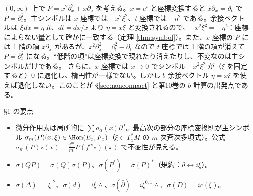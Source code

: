 \begin{ex}\label{ex:logcoord}
$(0,\infty)$ 上で $P=x^2\partial_x^2+x\partial_x$ を考える。$x=e^t$ と座標変換すると $x\partial_x=\partial_t$ で $P=\partial_t^2$。主シンボルは $x$ 座標では $-x^2\xi^2$、$t$ 座標では $-\eta^2$ である。余接ベクトルは $\xi\,dx=\eta\,dt$、$dt=dx/x$ より $\eta=x\xi$ と変換されるので、$-x^2\xi^2=-\eta^2$：座標によらない量として確かに一致する（定理 \ref{thm:symbol}）。また、$x$ 座標の $P$ には 1 階の項 $x\partial_x$ があるが、$x^2\partial_x^2=\partial_t^2-\partial_t$ なので $t$ 座標では 1 階の項が消えて $P=\partial_t^2$ になる。``低階の項''は座標変換で現れたり消えたりし、不変なのは主シンボルだけである。
さらに、$x$ 座標では $x\to0$ でシンボル $-x^2\xi^2$ が（$\xi$ を固定すると）$0$ に退化し、楕円性が一様でない。しかし $b$-余接ベクトル $\eta=x\xi$ を使えば退化しない。このことが \S\ref{sec:noncompact} と第10巻の $b$-計算の出発点である。
\end{ex}
\begin{keybox}{§1 の要点}
\begin{itemize}
\item 微分作用素は局所的に $\sum a_\alpha(x)\partial^\alpha$。最高次の部分の座標変換則が主シンボル $\sigma_m(P)(x,\xi)\in\Hom(E_x,F_x)$（$\xi\in T^*_xM$ の $m$ 次斉次多項式）。公式 $\sigma_m(P)s(x)=\frac{i^m}{m!}P(f^ms)(x)$ で不変性が見える。
\item $\sigma(QP)=\sigma(Q)\sigma(P)$、$\sigma(P^*)=\sigma(P)^*$（規約：$\partial\leftrightarrow i\xi$）。
\item $\sigma(\Delta)=|\xi|^2$、$\sigma(d)=i\xi\wedge$、$\sigma(\bar\partial)=i\xi^{0,1}\wedge$、$\sigma(D)=ic(\xi)$。
\end{itemize}
\end{keybox}

